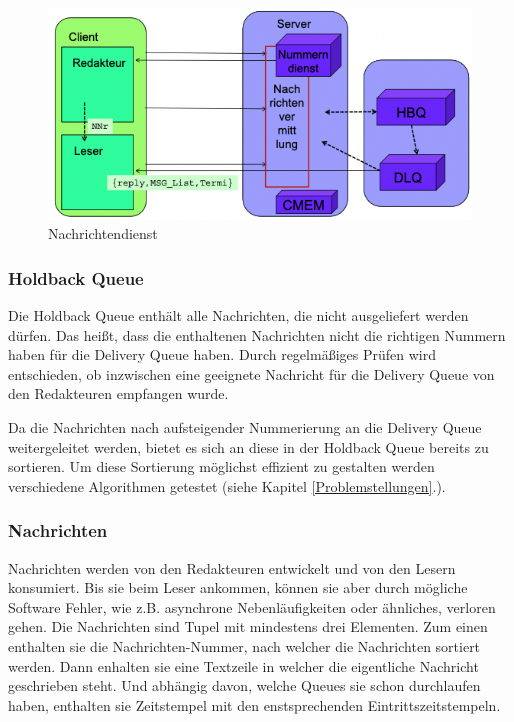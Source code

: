\begin{figure}[htbp]
\begin{center}
\includegraphics[scale=0.6]{Bilder/NachrichtendienstAbb.png}
\caption{\label{fig:nachrichtendienst} Nachrichtendienst \cite{Klauck2021}} 
\end{center}
\end{figure}

\subsubsection{Holdback Queue}

Die Holdback Queue enthält alle Nachrichten, die nicht ausgeliefert werden dürfen. Das heißt, dass die enthaltenen Nachrichten nicht die richtigen Nummern haben für die Delivery Queue haben. Durch regelmäßiges Prüfen wird entschieden, ob inzwischen eine geeignete Nachricht für die Delivery Queue von den Redakteuren empfangen wurde. 

Da die Nachrichten nach aufsteigender Nummerierung an die Delivery Queue weitergeleitet werden, bietet es sich an diese in der Holdback Queue bereits zu sortieren. 
Um diese Sortierung möglichst effizient zu gestalten werden verschiedene Algorithmen getestet (siehe Kapitel \ref{Problemstellungen}.).

\subsubsection{Nachrichten}

Nachrichten werden von den Redakteuren entwickelt und von den Lesern konsumiert. Bis sie beim Leser ankommen, können sie aber durch mögliche Software Fehler, wie z.B. asynchrone Nebenläufigkeiten oder ähnliches, verloren gehen. 
Die Nachrichten sind Tupel mit mindestens drei Elementen. Zum einen enthalten sie die Nachrichten-Nummer, nach welcher die Nachrichten sortiert werden. Dann enhalten sie eine Textzeile in welcher die eigentliche Nachricht geschrieben steht. Und abhängig davon, welche Queues sie schon durchlaufen haben, enthalten sie Zeitstempel mit den enstsprechenden Eintrittszeitstempeln. 

